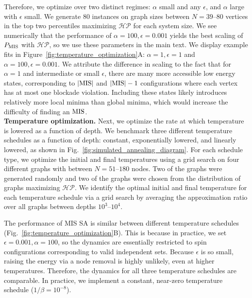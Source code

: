 \documentclass[twocolumn,amssymb,secnumarabic, prl, aps, nofootinbib]{revtex4-1}
\newcommand{\MIS}{\textnormal{MIS}}
\newcommand{\PMIS}{P_\textnormal{MIS}}
\begin{document}
Therefore, we optimize over two distinct regimes: $\alpha$ small and any $\epsilon$, and $\alpha$ large with $\epsilon$ small. We generate 80 instances on graph sizes between $N=39$--$80$ vertices in the top two percentiles  maximizing $\mathcal{HP}$ for each system size.
We see numerically that the performance of $\alpha = 100, \epsilon=0.001$ yields the best scaling of $\PMIS$ with $\mathcal{HP}$, so we use these parameters in the main text. We display example fits in Figure~\ref{fig:temperature_optimization}A: $\alpha =1, \epsilon=1$ and $\alpha = 100, \epsilon = 0.001.$ We attribute the difference in scaling to the fact that for $\alpha =1$ and intermediate or small $\epsilon$, there are many more accessible low energy states, corresponding to $|\MIS|$ and $|\MIS|-1$ configurations where each vertex has at most one blockade violation. Including these states likely introduces relatively more local minima than global minima, which would increase the difficulty of finding an $\MIS$. \\



\noindent \textbf{Temperature optimization. }
Next, we optimize the rate at which temperature is lowered as a function of depth. We benchmark three different temperature schedules as a function of depth: constant, exponentially lowered, and linearly lowered, as shown in  Fig.~\ref{fig:simulated_annealing_diagram}. For each schedule type, we optimize the initial and final temperatures using a grid search on four different graphs with between $N=51$--$180$ nodes. Two of the graphs were generated randomly and two of the graphs were chosen from the distribution of graphs maximizing $\mathcal{HP}$. We identify the optimal initial and final temperature for each temperature schedule via a grid search by averaging the approximation ratio over all graphs between depths $10^3$--$10^4$.

The performance of MIS SA is similar between different temperature schedules (Fig.~\ref{fig:temperature_optimization}B). This is because in practice, we set $\epsilon=0.001, \alpha=100$, so the dynamics are essentially restricted to spin configurations corresponding to valid independent sets. Because $\epsilon$ is so small, raising the energy via a node removal is highly unlikely, even at higher temperatures. Therefore, the dynamics for all three temperature schedules are comparable. In practice, we implement a constant, near-zero temperature schedule ($1/\beta=10^{-8}$).
\end{document}
